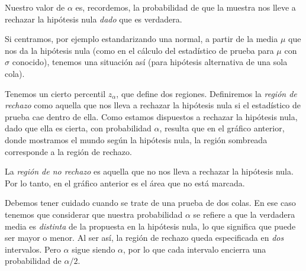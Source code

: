 Nuestro valor de \(\alpha\) es, recordemos, la probabilidad de que la muestra nos lleve a rechazar la hipótesis nula \emph{dado} que es verdadera. 

Si centramos, por ejemplo estandarizando una normal, a partir de la media \(\mu\) que nos da la hipótesis nula (como en el cálculo del estadístico de prueba para \(\mu\) con \(\sigma\) conocido), tenemos una situación así (para hipótesis alternativa de una sola cola).


Tenemos un cierto percentil \(z_{\alpha}\), que define dos regiones. Definiremos la \emph{región de rechazo} como aquella que nos lleva a rechazar la hipótesis nula si el estadístico de prueba cae dentro de ella. Como estamos dispuestos a rechazar la hipótesis nula, dado que ella es cierta, con probabilidad \(\alpha\), resulta que en el gráfico anterior, donde mostramos el mundo según la hipótesis nula, la región sombreada corresponde a la región de rechazo.

La \emph{región de no rechazo} es aquella que no nos lleva a rechazar la hipótesis nula. Por lo tanto, en el gráfico anterior es el área que no está marcada.

Debemos tener cuidado cuando se trate de una prueba de dos colas. En ese caso tenemos que considerar que nuestra probabilidad \(\alpha\) se refiere a que la verdadera media es \emph{distinta} de la propuesta en la hipótesis nula, lo que significa que puede ser mayor o menor. Al ser así, la región de rechazo queda especificada en \emph{dos} intervalos. Pero \(\alpha\) sigue siendo \(\alpha\), por lo que cada intervalo encierra una probabilidad de \(\alpha/2\).


